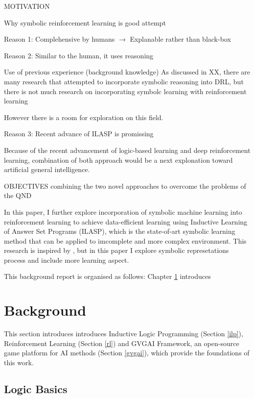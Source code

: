 \documentclass[12pt,twoside]{report}
\begin{document}
MOTIVATION

Why symbolic reinforcement learning is good attempt


Reason 1: Complehensive by humans $\rightarrow$ Explanable rather than black-box

Reason 2: Similar to the human, it uses reasoning

Use of previous experience (background knowledge)
As discussed in XX, there are many research that attempted to incorporate symbolic reasoning into DRL, but there is not much research on incorporating symbolc learning with reinforcement learning

However there is a room for exploration on this field.

Reason 3: Recent advance of ILASP is promissing

Because of the recent advancement of logic-based learning and deep reinforcement learning, combination of both approach would be a next explonation toward artificial general intelligence.


OBJECTIVES
combining the two novel approaches to overcome the problems of the QND





In this paper, I further explore incorporation of symbolic machine learning into reinforcement learning to achieve data-efficient learning using Inductive Learning of Answer Set Programs (ILASP), which is the state-of-art symbolic learning method that can be applied to imcomplete and more complex environment.
This research is inspired by \cite{Garnelo2016}, but in this paper I explore symbolic represetations process and include more learning aspect.

This background report is organised as follows: Chapter \ref{background} introduces

\chapter{Background}
\label{background}

This section introduces introduces Inductive Logic Programming (Section \ref{ilp}), Reinforcement Learning (Section \ref{rl}) and GVGAI Framework, an open-source game platform for AI methods (Section \ref{gvgai}), which provide the foundations of this work.

\section{Logic Basics}
\end{document}
